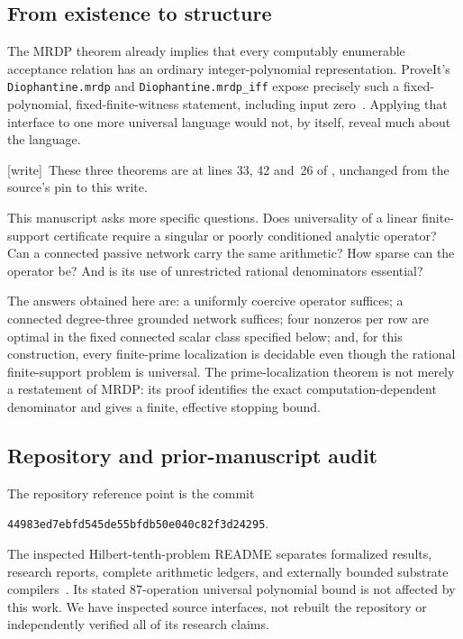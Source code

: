 \documentclass[11pt,letterpaper]{article}
\theoremstyle{definition}
\theoremstyle{remark}
\newcommand{\pin}{44983ed7ebfd545de55bfdb50e040c82f3d24295}
\newcommand{\wtag}{\textup{[write]}}
\begin{document}
\subsection{From existence to structure}
The MRDP theorem already implies that every computably enumerable acceptance
relation has an ordinary integer-polynomial representation. ProveIt's
\texttt{Diophantine.mrdp} and \texttt{Diophantine.mrdp\_iff} expose precisely
such a fixed-polynomial, fixed-finite-witness statement, including input
zero~\cite{repo-mrdp}. Applying that interface to one more universal language
would not, by itself, reveal much about the language.

\wtag\ These three theorems are at lines 33, 42 and~26 of , unchanged from the source's pin to this write.

This manuscript asks more specific questions. Does universality of a linear
finite-support certificate require a singular or poorly conditioned analytic
operator? Can a connected passive network carry the same arithmetic? How
sparse can the operator be? And is its use of unrestricted rational
denominators essential?

The answers obtained here are: a uniformly coercive operator suffices; a
connected degree-three grounded network suffices; four nonzeros per row are
optimal in the fixed connected scalar class specified below; and, for this
construction, every finite-prime localization is decidable even though the
rational finite-support problem is universal. The prime-localization theorem
is not merely a restatement of MRDP: its proof identifies the exact
computation-dependent denominator and gives a finite, effective stopping
bound.

\subsection{Repository and prior-manuscript audit}
The repository reference point is the commit
\begin{center}\small\texttt{\pin}.\end{center}
The inspected Hilbert-tenth-problem README separates formalized results,
research reports, complete arithmetic ledgers, and externally bounded
substrate compilers~\cite{repoH10}. Its stated 87-operation universal
polynomial bound is not affected by this work. We have inspected source
interfaces, not rebuilt the repository or independently verified all of its
research claims.
\end{document}
